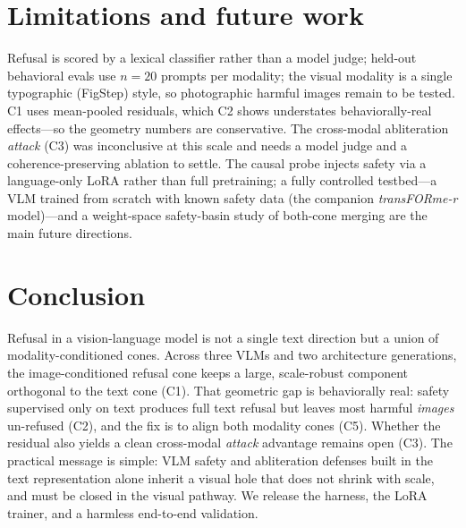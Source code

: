 \documentclass[11pt]{article}
\begin{document}
\section{Limitations and future work}
Refusal is scored by a lexical classifier rather than a model judge; held-out
behavioral evals use $n{=}20$ prompts per modality; the visual modality is a single
typographic (FigStep) style, so photographic harmful images remain to be tested. C1
uses mean-pooled residuals, which C2 shows understates behaviorally-real effects---so
the geometry numbers are conservative. The cross-modal abliteration \emph{attack} (C3)
was inconclusive at this scale and needs a model judge and a coherence-preserving
ablation to settle. The causal probe injects safety via a language-only LoRA rather
than full pretraining; a fully controlled testbed---a VLM trained from scratch with
known safety data (the companion \emph{transFORme-r} model)---and a weight-space
safety-basin study of both-cone merging are the main future directions.

\section{Conclusion}
Refusal in a vision-language model is not a single text direction but a union of
modality-conditioned cones. Across three VLMs and two architecture generations, the
image-conditioned refusal cone keeps a large, scale-robust component orthogonal to the
text cone (C1). That geometric gap is behaviorally real: safety supervised only on text
produces full text refusal but leaves most harmful \emph{images} un-refused (C2), and
the fix is to align both modality cones (C5). Whether the residual also yields a clean
cross-modal \emph{attack} advantage remains open (C3). The practical message is simple:
VLM safety and abliteration defenses built in the text representation alone inherit a
visual hole that does not shrink with scale, and must be closed in the visual pathway.
We release the harness, the LoRA trainer, and a harmless end-to-end validation.



\end{document}

